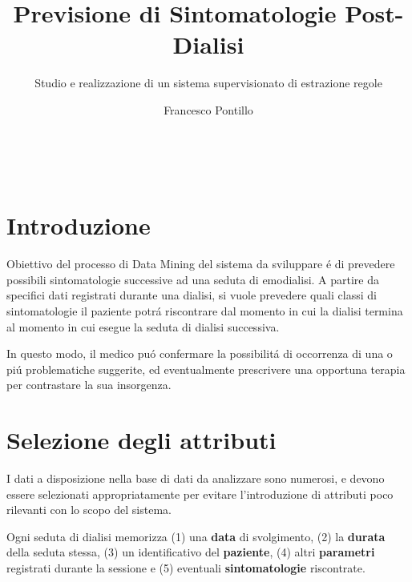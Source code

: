 \documentclass{acm_proc_article-sp}
\begin{document}
\title{Previsione di Sintomatologie Post-Dialisi}
\subtitle{Studio e realizzazione di un sistema supervisionato di estrazione regole}

\author{
	\alignauthor
	Francesco Pontillo\\
       \\
       \\
       \\
}

\maketitle


\section{Introduzione}
Obiettivo del processo di Data Mining del sistema da sviluppare \'e di prevedere possibili sintomatologie successive ad una seduta di emodialisi.
A partire da specifici dati registrati durante una dialisi, si vuole prevedere quali classi di sintomatologie il paziente potr\'a riscontrare dal momento in cui la dialisi termina al momento in cui esegue la seduta di dialisi successiva.

In questo modo, il medico pu\'o confermare la possibilit\'a di occorrenza di una o pi\'u problematiche suggerite, ed eventualmente prescrivere una opportuna terapia per contrastare la sua insorgenza.

\section{Selezione degli attributi}
I dati a disposizione nella base di dati da analizzare sono numerosi, e devono essere selezionati appropriatamente per evitare l'introduzione di attributi poco rilevanti con lo scopo del sistema.

Ogni seduta di dialisi memorizza (1) una \textbf{data} di svolgimento, (2) la \textbf{durata} della seduta stessa, (3) un identificativo del \textbf{paziente}, (4) altri \textbf{parametri} registrati durante la sessione e (5) eventuali \textbf{sintomatologie} riscontrate.
\end{document}
